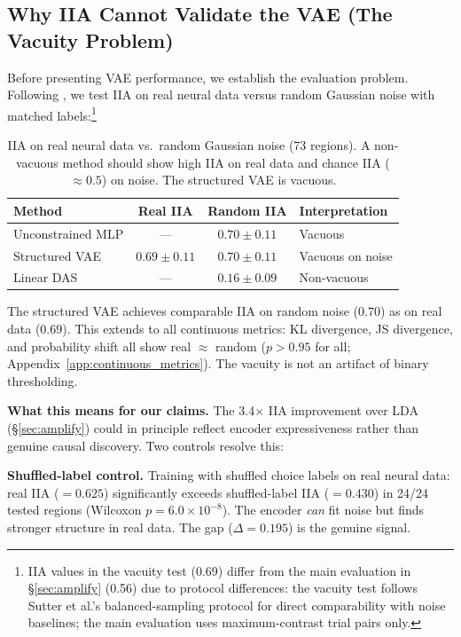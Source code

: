 \documentclass{article}
\begin{document}
\subsection{Why IIA Cannot Validate the VAE (The Vacuity Problem)}
\label{sec:vacuity}

Before presenting VAE performance, we establish the evaluation problem. Following \citet{sutter2025iia}, we test IIA on real neural data versus random Gaussian noise with matched labels:\footnote{IIA values in the vacuity test (0.69) differ from the main evaluation in \S\ref{sec:amplify} (0.56) due to protocol differences: the vacuity test follows Sutter et al.'s balanced-sampling protocol for direct comparability with noise baselines; the main evaluation uses maximum-contrast trial pairs only.}

\begin{table}[h]
\centering
\small
\caption{IIA on real neural data vs.\ random Gaussian noise (73 regions). A non-vacuous method should show high IIA on real data and chance IIA ($\approx 0.5$) on noise. The structured VAE is vacuous.}
\label{tab:sutter}
\begin{tabular}{lccl}
\toprule
Method & Real IIA & Random IIA & Interpretation \\
\midrule
Unconstrained MLP & --- & $0.70 \pm 0.11$ & Vacuous \\
Structured VAE & $0.69 \pm 0.11$ & $0.70 \pm 0.11$ & Vacuous on noise \\
Linear DAS & --- & $0.16 \pm 0.09$ & Non-vacuous \\
\bottomrule
\end{tabular}
\end{table}

The structured VAE achieves comparable IIA on random noise ($0.70$) as on real data ($0.69$). This extends to all continuous metrics: KL divergence, JS divergence, and probability shift all show real $\approx$ random ($p > 0.95$ for all; Appendix~\ref{app:continuous_metrics}). The vacuity is not an artifact of binary thresholding.

\textbf{What this means for our claims.} The 3.4$\times$ IIA improvement over LDA (\S\ref{sec:amplify}) could in principle reflect encoder expressiveness rather than genuine causal discovery. Two controls resolve this:

\textbf{Shuffled-label control.} Training with shuffled choice labels on real neural data: real IIA ($= 0.625$) significantly exceeds shuffled-label IIA ($= 0.430$) in 24/24 tested regions (Wilcoxon $p = 6.0 \times 10^{-8}$). The encoder \emph{can} fit noise but finds stronger structure in real data. The gap ($\Delta = 0.195$) is the genuine signal.
\end{document}
